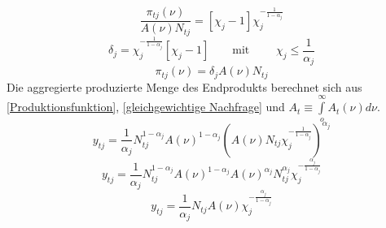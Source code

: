 \begin{equation}
\frac{\pi_{tj}(\nu)}{A(\nu)N_{tj}}=[\chi_j-1]\chi_j^{-\frac{1}{1-\alpha_j}}
\end{equation}
\begin{equation*}
\delta_j= \chi_j^{-\frac{1}{1-\alpha_j}}[\chi_j-1] \qquad  \text{mit } \qquad \chi_j\leq\frac{1}{\alpha_j}
\end{equation*}
\vspace{-0.4cm}
\begin{equation}
\pi_{tj}(\nu)=\delta_jA(\nu)N_{tj}
\end{equation}
Die aggregierte produzierte Menge des Endprodukts berechnet sich aus \eqref{Produktionsfunktion}, \eqref{gleichgewichtige Nachfrage} und $A_t\equiv \int \limits_{o}^\infty{A_t(\nu)}d\nu$.
\begin{equation*}
y_{tj}=\frac{1}{\alpha_j}N_{tj}^{1-\alpha_j}A(\nu)^{1-\alpha_j}\left(A(\nu)N_{tj}\chi_j^{-\frac{1}{1-\alpha_j}}\right)^{\alpha_j}
\end{equation*}
\begin{equation*}
y_{tj}=\frac{1}{\alpha_j}N_{tj}^{1-\alpha_j}A(\nu)^{1-\alpha_j} A(\nu)^{\alpha_j}N_{tj}^{\alpha_j}\chi_j^{-\frac{\alpha_j}{1-\alpha_j}}
\end{equation*}
\begin{equation}
\boxed{y_{tj}=\frac{1}{\alpha_j}N_{tj}A(\nu)\chi_j^{-\frac{\alpha_j}{1-\alpha_j}}}
\end{equation}

